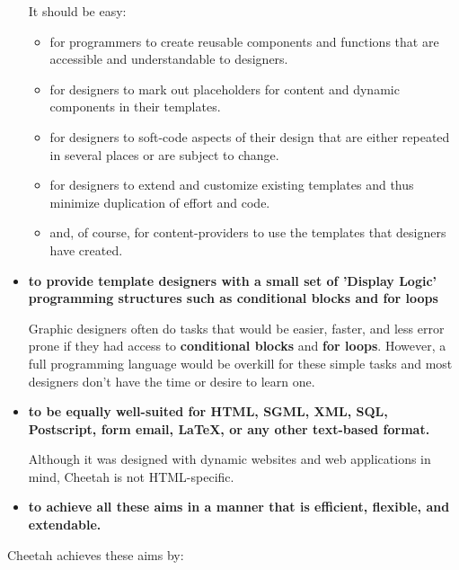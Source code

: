 \begin{itemize}
     It should be easy:
     \begin{itemize}
     \item for programmers to create reusable components and functions that are
          accessible and understandable to designers.
     \item for designers to mark out placeholders for content and dynamic components
          in their templates.
     \item for designers to soft-code aspects of their design that are either
          repeated in several places or are subject to change.
     \item for designers to extend and customize existing templates and thus minimize
          duplication of effort and code.
     \item and, of course, for content-providers to use the templates that
          designers have created.
     \end{itemize}

     
\item {\bf to provide template designers with a small set of 'Display Logic'
       programming structures such as conditional blocks and 
       for loops}
     
     Graphic designers often do tasks that would be easier, faster, and less
     error prone if they had access to {\bf conditional blocks} and {\bf for
       loops}.  However, a full programming language would be overkill for these
     simple tasks and most designers don't have the time or desire to learn one.
     
\item {\bf to be equally well-suited for HTML, SGML, XML, SQL, Postscript, form
       email, LaTeX, or any other text-based format.}
     
     Although it was designed with dynamic websites and web applications in mind,
     Cheetah is not HTML-specific.
     
\item {\bf to achieve all these aims in a manner that is efficient, flexible, and
       extendable.}
     
\end{itemize}

Cheetah achieves these aims by:

